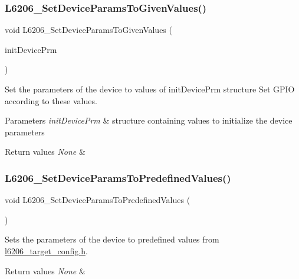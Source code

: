 \subsubsection{\texorpdfstring{L6206\+\_\+\+Set\+Device\+Params\+To\+Given\+Values()}{L6206\_SetDeviceParamsToGivenValues()}}
{\footnotesize\ttfamily void L6206\+\_\+\+Set\+Device\+Params\+To\+Given\+Values (\begin{DoxyParamCaption}\item[{\mbox{\hyperlink{struct_l6206___init_type_def}{L6206\+\_\+\+Init\+Type\+Def}} $\ast$}]{init\+Device\+Prm }\end{DoxyParamCaption})}



Set the parameters of the device to values of init\+Device\+Prm structure Set G\+P\+IO according to these values. 


\begin{DoxyParams}{Parameters}
{\em init\+Device\+Prm} & structure containing values to initialize the device parameters \\
\hline
\end{DoxyParams}

\begin{DoxyRetVals}{Return values}
{\em None} & \\
\hline
\end{DoxyRetVals}
\mbox{\label{group___l6206___private__functions_ga1e49f28c219e930c3eacdadee0079bfa}} 
\subsubsection{\texorpdfstring{L6206\+\_\+\+Set\+Device\+Params\+To\+Predefined\+Values()}{L6206\_SetDeviceParamsToPredefinedValues()}}
{\footnotesize\ttfamily void L6206\+\_\+\+Set\+Device\+Params\+To\+Predefined\+Values (\begin{DoxyParamCaption}\item[{void}]{ }\end{DoxyParamCaption})}



Sets the parameters of the device to predefined values from \mbox{\hyperlink{l6206__target__config_8h}{l6206\+\_\+target\+\_\+config.\+h}}. 


\begin{DoxyRetVals}{Return values}
{\em None} & \\
\hline
\end{DoxyRetVals}

